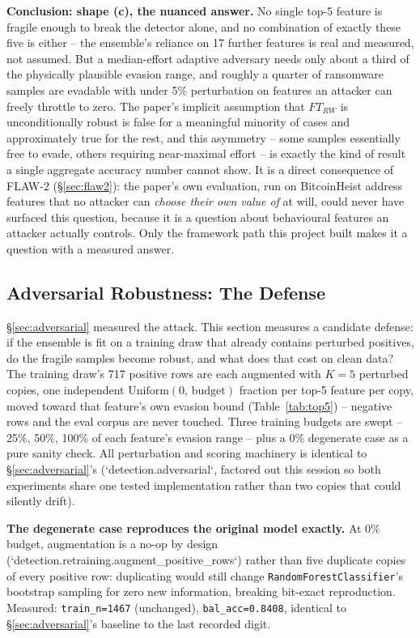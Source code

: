 \documentclass[conference]{IEEEtran}
\begin{document}
\textbf{Conclusion: shape (c), the nuanced answer.} No single top-5 feature is fragile enough to
break the detector alone, and no combination of exactly these five is either -- the ensemble's
reliance on 17 further features is real and measured, not assumed. But a median-effort adaptive
adversary needs only about a third of the physically plausible evasion range, and roughly a
quarter of ransomware samples are evadable with under 5\% perturbation on features an attacker can
freely throttle to zero. The paper's implicit assumption that $FT_{RW}$ is unconditionally robust
is false for a meaningful minority of cases and approximately true for the rest, and this
asymmetry -- some samples essentially free to evade, others requiring near-maximal effort -- is
exactly the kind of result a single aggregate accuracy number cannot show. It is a direct
consequence of FLAW-2 (\S\ref{sec:flaw2}): the paper's own evaluation, run on BitcoinHeist address
features that no attacker can \emph{choose their own value of} at will, could never have surfaced
this question, because it is a question about behavioural features an attacker actually controls.
Only the framework path this project built makes it a question with a measured answer.

\subsection{Adversarial Robustness: The Defense}
\label{sec:m7-8}

\S\ref{sec:adversarial} measured the attack. This section measures a candidate defense: if the
ensemble is fit on a training draw that already contains perturbed positives, do the fragile
samples become robust, and what does that cost on clean data? The training draw's 717 positive
rows are each augmented with $K=5$ perturbed copies, one independent
$\mathrm{Uniform}(0,\,\mathrm{budget})$ fraction per top-5 feature per copy, moved toward that
feature's own evasion bound (Table~\ref{tab:top5}) -- negative rows and the eval corpus are never
touched. Three training budgets are swept -- 25\%, 50\%, 100\% of each feature's evasion range --
plus a 0\% degenerate case as a pure sanity check. All perturbation and scoring machinery is
identical to \S\ref{sec:adversarial}'s (`detection.adversarial`, factored out this session so both
experiments share one tested implementation rather than two copies that could silently drift).

\textbf{The degenerate case reproduces the original model exactly.} At 0\% budget, augmentation is
a no-op by design (`detection.retraining.augment\_positive\_rows`) rather than five duplicate
copies of every positive row: duplicating would still change
\texttt{RandomForestClassifier}'s bootstrap sampling for zero new information, breaking bit-exact
reproduction. Measured: \texttt{train\_n=1467} (unchanged), \texttt{bal\_acc=0.8408}, identical to
\S\ref{sec:adversarial}'s baseline to the last recorded digit.
\end{document}
